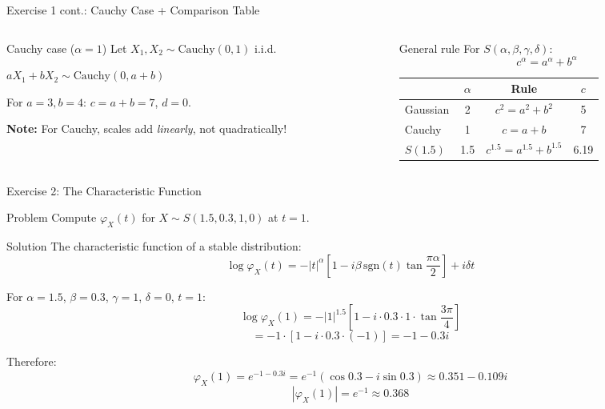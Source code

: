 \documentclass[9pt, aspectratio=169, t]{beamer}
\theoremstyle{definition}
\begin{document}
\begin{frame}{Exercise 1 cont.: Cauchy Case + Comparison Table}
\begin{columns}[T]
\begin{column}{0.48\textwidth}
\begin{block}{Cauchy case ($\alpha = 1$)}
Let $X_1, X_2 \sim \text{Cauchy}(0,1)$ i.i.d.

$aX_1 + bX_2 \sim \text{Cauchy}(0, a+b)$

For $a=3, b=4$: $c = a + b = 7$, $d = 0$.

\vspace{0.2cm}
\textbf{Note:} For Cauchy, scales add \textit{linearly}, not quadratically!
\end{block}
\end{column}
\begin{column}{0.48\textwidth}
\begin{block}{General rule}
For $S(\alpha, \beta, \gamma, \delta)$:
$$c^\alpha = a^\alpha + b^\alpha$$

\vspace{0.2cm}
\renewcommand{\arraystretch}{1.3}
\begin{tabular}{lccc}
\toprule
& $\alpha$ & Rule & $c$ \\
\midrule
Gaussian & 2 & $c^2 = a^2+b^2$ & 5 \\
Cauchy & 1 & $c = a+b$ & 7 \\
$S(1.5)$ & 1.5 & $c^{1.5} = a^{1.5}+b^{1.5}$ & 6.19 \\
\bottomrule
\end{tabular}
\end{block}
\end{column}
\end{columns}
\end{frame}

\begin{frame}{Exercise 2: The Characteristic Function}
\begin{block}{Problem}
Compute $\varphi_X(t)$ for $X \sim S(1.5, 0.3, 1, 0)$ at $t = 1$.
\end{block}

\begin{exampleblock}{Solution}
The characteristic function of a stable distribution:
$$\log \varphi_X(t) = -|t|^\alpha \left[1 - i\beta\,\text{sgn}(t)\tan\frac{\pi\alpha}{2}\right] + i\delta t$$

For $\alpha = 1.5$, $\beta = 0.3$, $\gamma = 1$, $\delta = 0$, $t = 1$:
$$\log \varphi_X(1) = -|1|^{1.5}\left[1 - i \cdot 0.3 \cdot 1 \cdot \tan\frac{3\pi}{4}\right]$$
$$= -1 \cdot [1 - i \cdot 0.3 \cdot (-1)] = -1 - 0.3i$$

Therefore:
$$\varphi_X(1) = e^{-1 - 0.3i} = e^{-1}(\cos 0.3 - i\sin 0.3) \approx 0.351 - 0.109i$$
$$|\varphi_X(1)| = e^{-1} \approx 0.368$$
\end{exampleblock}
\end{frame}
\end{document}
